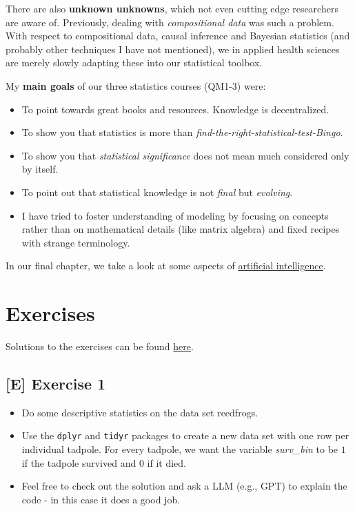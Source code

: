 \documentclass[
]{book}
\providecommand{\tightlist}{%
  \setlength{\itemsep}{0pt}\setlength{\parskip}{0pt}}
\begin{document}
There are also \textbf{unknown unknowns}, which not even cutting edge researchers are aware of.
Previously, dealing with \emph{compositional data} was such a problem.
With respect to compositional data, causal inference and Bayesian statistics (and probably other techniques I have not mentioned),
we in applied health sciences are merely slowly adapting these into our statistical toolbox.

My \textbf{main goals} of our three statistics courses (QM1-3) were:

\begin{itemize}
\tightlist
\item
  To point towards great books and resources. Knowledge is decentralized.
\item
  To show you that statistics is more than \emph{find-the-right-statistical-test-Bingo}.
\item
  To show you that \emph{statistical significance} does not mean much considered only by itself.
\item
  To point out that statistical knowledge is not \emph{final} but \emph{evolving}.
\item
  I have tried to foster understanding of modeling by focusing on concepts
  rather than on mathematical details (like matrix algebra) and fixed recipes with strange terminology.
\end{itemize}

In our final chapter, we take a look at some aspects of
\href{https://en.wikipedia.org/wiki/Artificial_intelligence}{artificial intelligence}.

\section{Exercises}\label{exercises-1}

Solutions to the exercises can be found
\href{https://github.com/jdegenfellner/Script_QM3_ZHAW/tree/main/Solutions_Exercises}{here}.

\subsection{{[}E{]} Exercise 1}\label{exercise1_LMM}

\begin{itemize}
\tightlist
\item
  Do some descriptive statistics on the data set reedfrogs.
\item
  Use the \texttt{dplyr} and \texttt{tidyr} packages to create a new data set with one row per individual tadpole.
  For every tadpole, we want the variable \emph{surv\_bin} to be \(1\) if the tadpole survived and \(0\) if it died.
\item
  Feel free to check out the solution and ask a LLM (e.g., GPT) to explain the code -
  in this case it does a good job.
\end{itemize}
\end{document}
